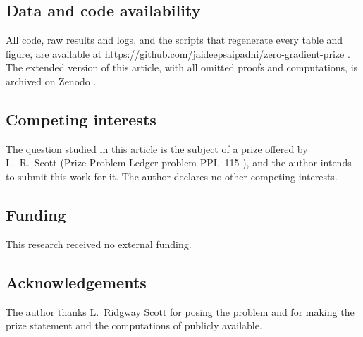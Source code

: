 \subsection*{Data and code availability}
All code, raw results and logs, and the scripts that regenerate every table and figure, are available at \url{https://github.com/jaideepsaipadhi/zero-gradient-prize} \cite{ZeroGradRepo}. The extended version of this article, with all omitted proofs and computations, is archived on Zenodo \cite{PadhiExt}.

\subsection*{Competing interests}
The question studied in this article is the subject of a prize offered by L.~R.~Scott (Prize Problem Ledger problem PPL~115 \cite{ScottPrize}), and the author intends to submit this work for it. The author declares no other competing interests.

\subsection*{Funding}
This research received no external funding.

\subsection*{Acknowledgements}
The author thanks L.~Ridgway Scott for posing the problem and for making the prize statement and the computations of \cite{GjerdeScott2024} publicly available.
